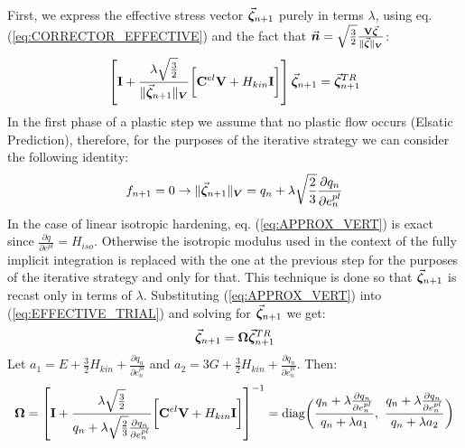 \begin{appendices}
First, we express the effective stress vector $\vec{\bm{\zeta}}_{n+1}$ purely in
terms $\lambda$, using 
eq. (\ref{eq:CORRECTOR_EFFECTIVE}) and the fact that $\vec{\bm{n}} =
\sqrt{\frac{3}{2}}\frac{\mathbf{V}\vec{\bm{\zeta}}}{\Vert\vec{\bm{\zeta}}\Vert_{\bm{V}}}$:
\begin{equation}
	\left[\mathbf{I}+\frac{\lambda\sqrt{\frac{3}{2}}}{\Vert\vec{\bm{\zeta}}_{n+1}\Vert_{\bm{V}}}\bigg[\mathbf{C}^{el}\mathbf{V}+H_{kin}\mathbf{I}\bigg]\right]\vec{\bm{\zeta}}_{n+1}
	= \vec{\bm{\zeta}}^{TR}_{n+1}
	\label{eq:EFFECTIVE_TRIAL}
\end{equation}
In the first phase of a plastic step we assume that no plastic flow occurs
(Elsatic Prediction), therefore, for the purposes of the iterative strategy we
can consider the following identity:
\begin{equation}
	f_{n+1} = 0 \rightarrow
	\Vert\vec{\bm{\zeta}}_{n+1}\Vert_{\bm{V}}= q_n +
	\lambda\sqrt{\frac{2}{3}}\frac{\partial q_n}{\partial e^{pl}_n}
	\label{eq:APPROX_VERT}
\end{equation}
In the case of linear isotropic hardening, eq. (\ref{eq:APPROX_VERT}) is exact
since $\frac{\partial q}{\partial e^{pl}} = H_{iso}$.
Otherwise the isotropic modulus used in the context of the fully implicit 
integration is replaced with the one at the previous step for the purposes of
the iterative strategy and only for that. This technique is done so that
$\vec{\bm{\zeta}}_{n+1}$ is recast only in terms of $\lambda$.
Substituting (\ref{eq:APPROX_VERT}) into (\ref{eq:EFFECTIVE_TRIAL}) and solving
for $\vec{\bm{\zeta}}_{n+1}$ we get:
\begin{equation}
	\vec{\bm{\zeta}}_{n+1} = \mathbf{\Omega}\vec{\bm{\zeta}}^{TR}_{n+1}
	\label{eq:ZETA2}
\end{equation}
\noindent  
Let $a_1 = E+\frac{3}{2}H_{kin} + \frac{\partial q_n}{\partial e^{pl}_n}$ and 
$a_2 = 3G+\frac{3}{2}H_{kin} + \frac{\partial q_n}{\partial e^{pl}_n}$. Then:
\begin{equation}
	\bmat{\Omega} =
	\left[\bmat{I}+\frac{\lambda\sqrt{\frac{3}{2}}}{q_n +
		\lambda\sqrt{\frac{2}{3}}\frac{\partial q_n}{\partial
			e^{pl}_n}}\bigg[\bmat{C}^{el}\bmat{V}+H_{kin}\bmat{I}\bigg]\right]^{-1}
			 =
	\text{diag}\bigg(\frac{q_n+\lambda\frac{\partial q_n}{\partial
			e^{pl}_n}}{q_n+\lambda a_1},\ \frac{q_n+\lambda\frac{\partial 
			q_n}{\partial
			e^{pl}_n}}{q_n+\lambda a_2}\bigg)
	\label{eq:OMEGA}
\end{equation}


\end{appendices}
